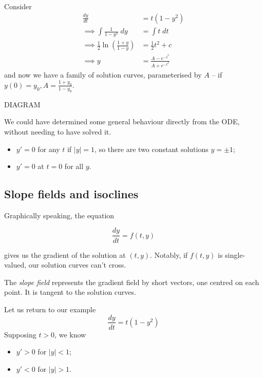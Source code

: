 \documentclass{../../template/note}
\begin{document}
    \begin{example}
        Consider
        \begin{align*}
            \frac{dy}{dt} &= t(1-y^2) \\
            \implies \int \frac{1}{1-y^2} \; dy &= \int t \; dt \\
            \implies \frac 1 2 \ln \left( \frac{1+y}{1-y} \right) &= \frac 1 2 t^2 + c \\
            \implies y &= \frac{A - e^{-t^2}}{A + e^{-t^2}}
        \end{align*}
        and now we have a family of solution curves, parameterised by \(A\) -- if \(y(0) = y_0, A = \frac{1+y_0}{1-y_0}\).

        DIAGRAM

        We could have determined some general behaviour directly from the ODE, without needing to have solved it.

        \begin{itemize}
            \item \(y' = 0\) for any \(t\) if \(|y| = 1\), so there are two constant solutions \(y = \pm 1\);
            \item \(y' = 0\) at \(t = 0\) for all \(y\).
        \end{itemize}
    \end{example}
    

    \subsection{Slope fields and isoclines}

    Graphically speaking, the equation

    \[
        \frac{dy}{dt} = f(t, y)
    \]

    gives us the gradient of the solution at \((t, y)\). Notably, if \(f(t, y)\) is single-valued, our solution curves can't cross.

    \begin{definition}
        The \emph{slope field} represents the gradient field by short vectors, one centred on each point. It is tangent to the solution curves.
    \end{definition}
    
    \begin{example}
        Let us return to our example
        \[
            \frac{dy}{dt} = t(1-y^2)
        \]
        Supposing \(t > 0\), we know
        \begin{itemize}
            \item \(y' > 0\) for \(|y| < 1\);
            \item \(y' < 0\) for \(|y| > 1\).
        \end{itemize}
    \end{example}
    
\end{document}

